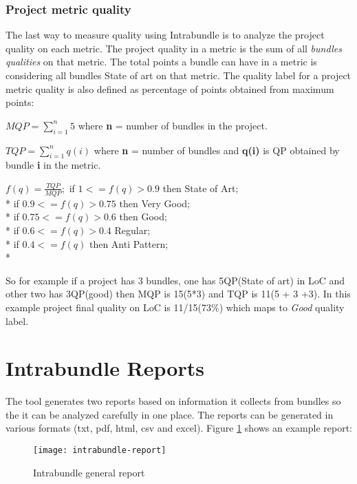 \subsubsection{Project metric quality}
\label{sec:project-quality-metric}
The last way to measure quality using Intrabundle is to analyze the project quality on each metric. The project quality in a metric is the sum of all \emph{bundles qualities} on that metric. The total points a bundle can have in a metric is considering all bundles State of art on that metric. The quality label for a project metric quality is also defined as percentage of points obtained from maximum points:

\(MQP = \sum_{i=1}^{n} 5 \) where \textbf{n} = number of bundles in the project. \newline

\(TQP = \sum_{i=1}^{n} q(i) \) where \textbf{n} = number of bundles and \textbf{q(i)} is QP obtained by bundle \textbf{i} in the metric. \newline

 
\(
f(q) = \frac{TQP}{MQP};
\)
\newline
\newline
 if \( 1 <= f(q) > 0.9 \) then State of Art; \\*
 if \( 0.9 <= f(q) > 0.75 \) then Very Good; \\*
 if \( 0.75 <= f(q) > 0.6 \) then Good; \\*
 if \( 0.6 <= f(q) > 0.4 \) Regular; \\*
 if \( 0.4 <= f(q) \) then Anti Pattern;\\*

So for example if a project has 3 bundles, one has 5QP(State of art) in LoC and other two has 3QP(good) then MQP is 15(5*3) and TQP is 11(5 + 3 +3). In this example project final quality on LoC is 11/15(73\%) which maps to \emph{Good} quality label.  

\section{Intrabundle Reports}
\label{sec:intrabundle-reports}
The tool generates two reports based on information it collects from bundles so the it can be analyzed carefully in one place. The reports can be generated in various formats (txt, pdf, html, csv and excel). Figure \ref{intrabundle-report1} shows an example report:  

\begin{figure}[h]
\caption{Intrabundle general report}
\label{intrabundle-report1}
\centering
\texttt{[image: intrabundle-report]}
\end{figure}  
\FloatBarrier

